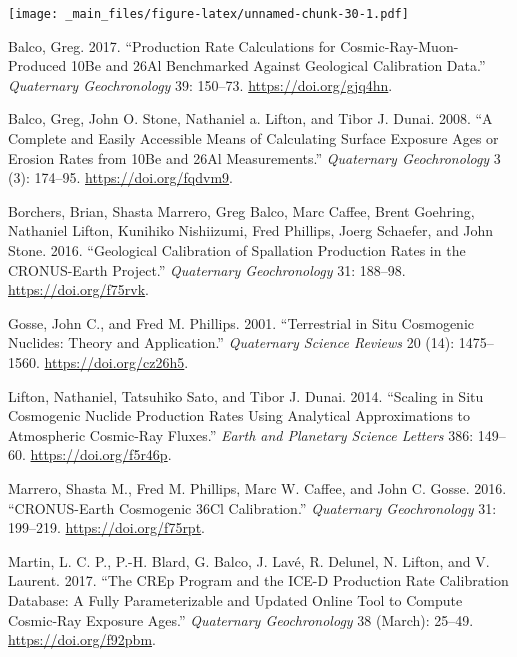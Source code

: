 \documentclass[
]{book}
\newlength{\cslhangindent}
\newlength{\cslentryspacingunit} %
\newenvironment{CSLReferences}[2] %
 {%
  \setlength{\parindent}{0pt}
  \ifodd #1
  \let\oldpar\par
  \def\par{\hangindent=\cslhangindent\oldpar}
  \fi
  \setlength{\parskip}{#2\cslentryspacingunit}
 }%
 {}
\begin{document}
\texttt{[image: \_main\_files/figure-latex/unnamed-chunk-30-1.pdf]}

\hypertarget{refs}{}
\begin{CSLReferences}{1}{0}
\leavevmode{}%
Balco, Greg. 2017. {``Production Rate Calculations for Cosmic-Ray-Muon-Produced {10Be} and {26Al} Benchmarked Against Geological Calibration Data.''} \emph{Quaternary Geochronology} 39: 150--73. \url{https://doi.org/gjq4hn}.

\leavevmode{}%
Balco, Greg, John O. Stone, Nathaniel a. Lifton, and Tibor J. Dunai. 2008. {``A Complete and Easily Accessible Means of Calculating Surface Exposure Ages or Erosion Rates from {10Be} and {26Al} Measurements.''} \emph{Quaternary Geochronology} 3 (3): 174--95. \url{https://doi.org/fqdvm9}.

\leavevmode{}%
Borchers, Brian, Shasta Marrero, Greg Balco, Marc Caffee, Brent Goehring, Nathaniel Lifton, Kunihiko Nishiizumi, Fred Phillips, Joerg Schaefer, and John Stone. 2016. {``Geological Calibration of Spallation Production Rates in the {CRONUS-Earth} Project.''} \emph{Quaternary Geochronology} 31: 188--98. \url{https://doi.org/f75rvk}.

\leavevmode{}%
Gosse, John C., and Fred M. Phillips. 2001. {``Terrestrial in Situ Cosmogenic Nuclides: Theory and Application.''} \emph{Quaternary Science Reviews} 20 (14): 1475--1560. \url{https://doi.org/cz26h5}.

\leavevmode{}%
Lifton, Nathaniel, Tatsuhiko Sato, and Tibor J. Dunai. 2014. {``Scaling in Situ Cosmogenic Nuclide Production Rates Using Analytical Approximations to Atmospheric Cosmic-Ray Fluxes.''} \emph{Earth and Planetary Science Letters} 386: 149--60. \url{https://doi.org/f5r46p}.

\leavevmode{}%
Marrero, Shasta M., Fred M. Phillips, Marc W. Caffee, and John C. Gosse. 2016. {``{CRONUS-Earth} Cosmogenic {36Cl} Calibration.''} \emph{Quaternary Geochronology} 31: 199--219. \url{https://doi.org/f75rpt}.

\leavevmode{}%
Martin, L. C. P., P.-H. Blard, G. Balco, J. Lavé, R. Delunel, N. Lifton, and V. Laurent. 2017. {``The {CREp} Program and the {ICE-D} Production Rate Calibration Database: {A} Fully Parameterizable and Updated Online Tool to Compute Cosmic-Ray Exposure Ages.''} \emph{Quaternary Geochronology} 38 (March): 25--49. \url{https://doi.org/f92pbm}.


\end{CSLReferences}
\end{document}
